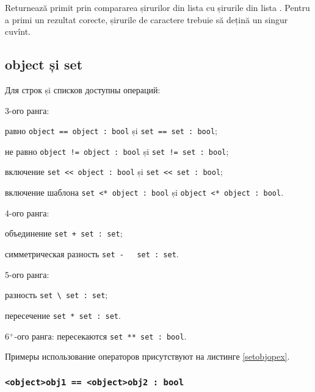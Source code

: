 Returnează primit prin compararea șirurilor din lista  cu șirurile din lista .
Pentru a primi un rezultat corecte, șirurile de caractere trebuie să dețină un singur cuvînt.

\subsection{{\color{lightblue}object} și {\color{lightblue}set}}

Для строк și списков доступны операций:
\begin{icItems}
	\item
		3-ого ранга:
		\begin{icItems}
		\item
			равно \lstinline`object == object : bool` și \lstinline`set == set : bool`;
		\item
			не равно \lstinline`object != object : bool` și \lstinline`set != set : bool`;
		\item
			включение \lstinline`set << object : bool` și \lstinline|set << set : bool|;
		\item
			включение шаблона \lstinline`set <* object : bool` și \lstinline`object <* object : bool`.
		\end{icItems}
	\item
		4-ого ранга:
		\begin{icItems}
		\item
			объединение \lstinline`set + set : set`;
		\item
			симметрическая разность \lstinline`set -   set : set`.
		\end{icItems}
	\item
		5-ого ранга:
		\begin{icItems}
		\item
			разность \lstinline`set \ set : set`;
		\item
			пересечение \lstinline`set * set : set`.
		\end{icItems}
	\item
		6$^+$-ого ранга: пересекаются \lstinline|set ** set : bool|.
\end{icItems}

Примеры использование операторов присутствуют на листинге \ref{setobjopex}.

\subsubsection{\lstinline`<object>obj1 == <object>obj2 : bool`}

